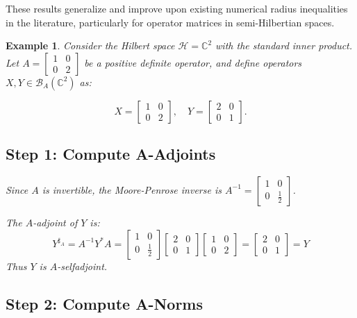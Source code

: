\documentclass{article}
\newtheorem{example}[theorem]{Example}
\begin{document}
These results generalize and improve upon existing numerical radius inequalities in the literature, particularly for operator matrices in semi-Hilbertian spaces.
\begin{example}
Consider the Hilbert space $\mathcal{H} = \mathbb{C}^2$ with the standard inner product. Let $A = \begin{bmatrix} 1 & 0 \\ 0 & 2 \end{bmatrix}$ be a positive definite operator, and define operators $X, Y \in \mathcal{B}_A(\mathbb{C}^2)$ as:

\[
X = \begin{bmatrix} 1 & 0 \\ 0 & 2 \end{bmatrix}, \quad Y = \begin{bmatrix} 2 & 0 \\ 0 & 1 \end{bmatrix}.
\]

\subsection*{Step 1: Compute A-Adjoints}

Since $A$ is invertible, the Moore-Penrose inverse is $A^{-1} = \begin{bmatrix} 1 & 0 \\ 0 & \frac{1}{2} \end{bmatrix}$.

The $A$-adjoint of $Y$ is:
\[
Y^{\sharp_A} = A^{-1}Y^*A = \begin{bmatrix} 1 & 0 \\ 0 & \frac{1}{2} \end{bmatrix}\begin{bmatrix} 2 & 0 \\ 0 & 1 \end{bmatrix}\begin{bmatrix} 1 & 0 \\ 0 & 2 \end{bmatrix} = \begin{bmatrix} 2 & 0 \\ 0 & 1 \end{bmatrix} = Y
\]
Thus $Y$ is $A$-selfadjoint.

\subsection*{Step 2: Compute A-Norms}


\end{example}
\end{document}
